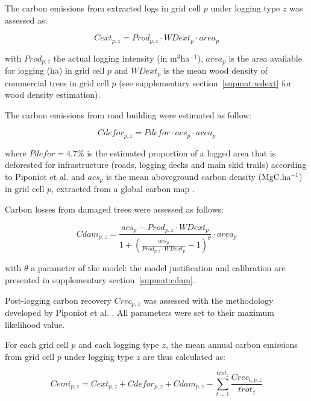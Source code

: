 \documentclass{article}
\begin{document}
The carbon emissions from extracted logs in grid cell $p$ under logging type $z$ was assessed as: 

\begin{equation}
\label{eq:cext}
    Cext_{p,z} = Prod_{p,z} \cdot WDext_p \cdot  area_p
\end{equation}

with $Prod_{p,z}$ the actual logging intensity (in m$^3$ha$^{-1}$), $area_p$ is the area available for logging (ha) in grid cell $p$ and $WDext_p$ is the mean wood density of commercial trees in grid cell $p$ (see supplementary section~\ref{supmat:wdext} for wood density estimation). 

The carbon emissions from road building were estimated as follow: 

\begin{equation}
\label{eq:croad}
    Cdefor_{p,z} = Pdefor \cdot acs_p \cdot area_p
\end{equation}

where $Pdefor = 4.7 $\% is the estimated proportion of a logged area that is deforested for infrastructure (roads, logging decks and main skid trails) according to Piponiot et al. \cite{Piponiot2016} and $acs_p$ is the mean aboveground carbon density (MgC.ha$^{-1}$) in grid cell $p$, extracted from a global carbon map \cite{Avitabile2016}. 

Carbon losses from damaged trees were assessed as follows: 

\begin{equation}
\label{eq:cdam}
    Cdam_{p,z} = \frac{acs_p  - Prod_{p,z} \cdot WDext_p } {1 + \left(\frac{acs_p}{Prod_{p,z} \cdot WDext_p}  -1 \right)^\theta} \cdot area_p
\end{equation}

with $\theta$ a parameter of the model: the model justification and calibration are presented in supplementary section~\ref{supmat:cdam}. 

Post-logging carbon recovery $Crec_{p,z}$ was assessed with the methodology developed by Piponiot et al. \cite{Piponiot2016a}.  
All parameters were set to their maximum likelihood value. 

For each grid cell $p$ and each logging type $z$, the mean annual carbon emissions from grid cell $p$ under logging type $z$ are thus calculated as: 

\begin{equation}
\label{eq:cemi}
    Cemi_{p,z} = Cext_{p,z} + Cdefor_{p,z} + Cdam_{p,z} -  \sum_{t=1}^{trot_z} \frac{Crec_{t,p,z}}{trot_z} 
\end{equation}
\end{document}
